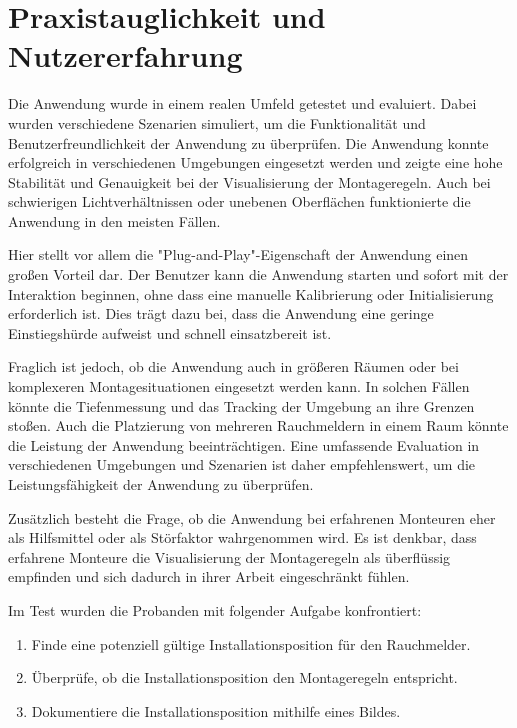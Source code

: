 \section{Praxistauglichkeit und Nutzererfahrung}

Die Anwendung wurde in einem realen Umfeld getestet und evaluiert. Dabei wurden verschiedene Szenarien simuliert, um die Funktionalität und Benutzerfreundlichkeit der Anwendung zu überprüfen. Die Anwendung konnte erfolgreich in verschiedenen Umgebungen eingesetzt werden und zeigte eine hohe Stabilität und Genauigkeit bei der Visualisierung der Montageregeln. Auch bei schwierigen Lichtverhältnissen oder unebenen Oberflächen funktionierte die Anwendung in den meisten Fällen.

Hier stellt vor allem die "Plug-and-Play"-Eigenschaft der Anwendung einen großen Vorteil dar. Der Benutzer kann die Anwendung starten und sofort mit der Interaktion beginnen, ohne dass eine manuelle Kalibrierung oder Initialisierung erforderlich ist. Dies trägt dazu bei, dass die Anwendung eine geringe Einstiegshürde aufweist und schnell einsatzbereit ist.

Fraglich ist jedoch, ob die Anwendung auch in größeren Räumen oder bei komplexeren Montagesituationen  eingesetzt werden kann. In solchen Fällen könnte die Tiefenmessung und das Tracking der Umgebung an ihre Grenzen stoßen. Auch die Platzierung von mehreren Rauchmeldern in einem Raum könnte die Leistung der Anwendung beeinträchtigen. Eine umfassende Evaluation in verschiedenen Umgebungen und Szenarien ist daher empfehlenswert, um die Leistungsfähigkeit der Anwendung zu überprüfen.

Zusätzlich besteht die Frage, ob die Anwendung bei erfahrenen Monteuren eher als Hilfsmittel oder als Störfaktor wahrgenommen wird. Es ist denkbar, dass erfahrene Monteure die Visualisierung der Montageregeln als überflüssig empfinden und sich dadurch in ihrer Arbeit eingeschränkt fühlen. 

Im Test wurden die Probanden mit folgender Aufgabe konfrontiert:
\begin{enumerate}
    \item Finde eine potenziell gültige Installationsposition für den Rauchmelder.
    \item Überprüfe, ob die Installationsposition den Montageregeln entspricht.
    \item Dokumentiere die Installationsposition mithilfe eines Bildes.
\end{enumerate}

